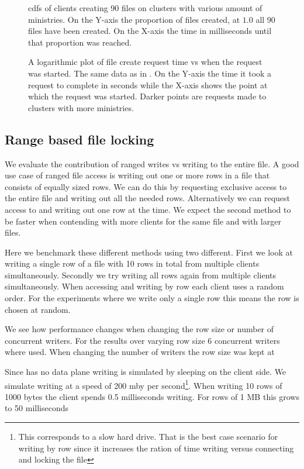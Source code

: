 \begin{figure}[htbp]
	\centering
	
	\caption{\acp{cdf} of clients creating 90 files on clusters with various amount of ministries. On the Y-axis the proportion of files created, at $1.0$ all 90 files have been created. On the X-axis the time in milliseconds until that proportion was reached.}
	\label{fig:touch}
\end{figure}

\begin{figure}[htbp]
	\centering
	
	\caption{A logarithmic plot of file create request time vs when the request was started. The same data as in . On the Y-axis the time it took a request to complete in seconds while the X-axis shows the point at which the request was started. Darker points are requests made to clusters with more ministries.}
	\label{fig:touch_vs_time}
\end{figure}

\clearpage{}
\subsection{Range based file locking}
We evaluate the contribution of ranged writes vs writing to the entire file. A good use case of ranged file access is writing out one or more rows in a file that consists of equally sized rows. We can do this by requesting exclusive access to the entire file and writing out all the needed rows. Alternatively we can request access to and writing out one row at the time. We expect the second method to be faster when contending with more clients for the same file and with larger files. 

Here we benchmark these different methods using two different. First we look at writing a single row of a file with 10 rows in total from multiple clients simultaneously. Secondly we try writing all rows again from multiple clients simultaneously. When accessing and writing by row each client uses a random order. For the experiments where we write only a single row this means the row is chosen at random.

We see how performance changes when changing the row size or number of concurrent writers. For the results over varying row size 6 concurrent writers where used. When changing the number of writers the row size was kept at %

Since \name{} has no data plane writing is simulated by sleeping on the client side. We simulate writing at a speed of 200 \ac{mby} per second\footnote{This corresponds to a slow hard drive. That is the best case scenario for writing by row since it increases the ration of time writing versus connecting and locking the file}. When writing 10 rows of 1000 bytes the client spends 0.5 milliseconds writing. For rows of 1 MB this grows to 50 milliseconds

